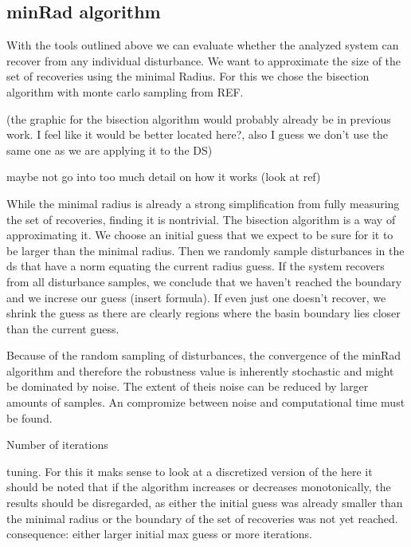 
\subsection{minRad algorithm}
    
    With the tools outlined above we can evaluate whether the analyzed system can recover from any individual disturbance. We want to approximate the size of the set of recoveries using the minimal Radius. 
    For this we chose the bisection algorithm with monte carlo sampling from REF.

    (the graphic for the bisection algorithm would probably already be in previous work. I feel like it would be better located here?, also I guess we don't use the same one as we are applying it to the DS)

    maybe not go into too much detail on how it works (look at ref)
    
    While the minimal radius is already a strong simplification from fully measuring the set of recoveries, finding it is nontrivial. The bisection algorithm is a way of approximating it. We choose an initial guess that we expect to be sure for it to be larger than the minimal radius. Then we randomly sample disturbances in the ds that have a norm equating the current radius guess. 
    If the system recovers from all disturbance samples, we conclude that we haven't reached the boundary and we increse our guess (insert formula). If even just one doesn't recover, we shrink the guess as there are clearly regions where the basin boundary lies closer than the current guess.   

    Because of the random sampling of disturbances, the convergence of the minRad algorithm and therefore the robustness value is inherently stochastic and might be dominated by noise. The extent of theis noise can be reduced by larger amounts of samples. An compromize between noise and computational time must be found.
    
    Number of iterations
    
    tuning. For this it maks sense to look at a discretized version of the 
    here it should be noted that if the algorithm increases or decreases monotonically, the results should be disregarded, as either the initial guess was already smaller than the minimal radius or the boundary of the set of recoveries was not yet reached. consequence: either larger initial max guess or more iterations.

